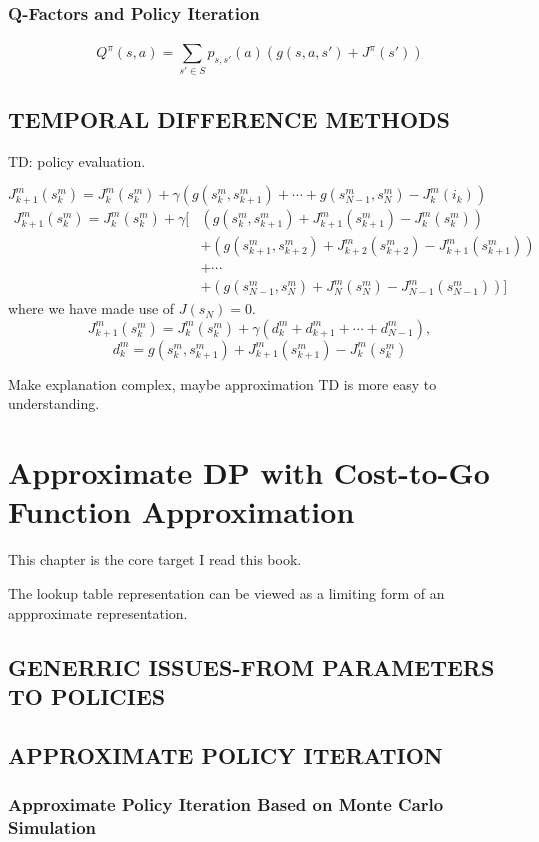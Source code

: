 \subsubsection{Q-Factors and Policy Iteration}%

\[
    Q^{\pi}(s,a) = \sum^{}_{s' \in S} p_{s, s'}(a) (g(s, a, s') + J^{\pi}(s'))
\]

\subsection{TEMPORAL DIFFERENCE METHODS}%

{TD}: policy evaluation.

$ J^{m}_{k+1}(s^m_k) = J^{m}_{k}(s^m_k) + \gamma(g(s^m_k, s^m_{k+1}) + \cdots + g(s^{m}_{N-1}, s^{m}_{N}) - J^m_{k}(i_k)) $
\begin{align*}
    J^{m}_{k+1}(s^m_k) = J^{m}_{k}(s^m_k) + \gamma [ &
    (g(s^m_k, s^m_{k+1}) + J^m_{k+1}(s^m_{k+1}) - J^{m}_{k}(s^m_{k})) \\
    &+ (g(s^m_{k+1}, s^m_{k+2}) + J^m_{k+2}(s^m_{k+2}) - J^{m}_{k+1}(s^m_{k+1})) \\
    &+ \cdots \\
    &+ (g(s^m_{N-1}, s^m_{N}) + J^m_{N}(s^m_{N}) - J^{m}_{N-1}(s^m_{N-1}))
    ]
\end{align*}
where we have made use of $ J(s_N) = 0 $.
\[
    J^{m}_{k+1}(s^m_k) = J^{m}_{k}(s^m_k) + \gamma(d^{m}_{k} + d^{m}_{k+1} + \cdots + d^{m}_{N-1}),
\]
\[
    d^m_{k} = g(s^m_k, s^{m}_{k+1}) + J^{m}_{k+1}(s^m_{k+1}) - J^{m}_{k}(s^m_k)
\]

Make explanation complex, maybe approximation TD is more easy to understanding.

\section{Approximate DP with Cost-to-Go Function Approximation}%

This chapter is the core target I read this book.

The lookup table representation can be viewed as a limiting form of an appproximate representation.

\subsection{GENERRIC ISSUES-FROM PARAMETERS TO POLICIES}%

\subsection{APPROXIMATE POLICY ITERATION}%

\subsubsection{Approximate Policy Iteration Based on Monte Carlo Simulation}%







